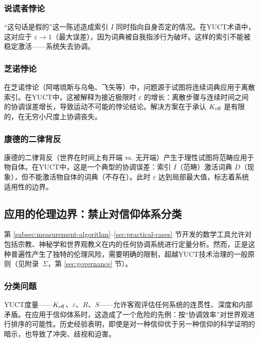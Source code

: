 \documentclass[11pt,a4paper]{article}
\newcommand{\eps}{\varepsilon}
\begin{document}
	\subsubsection{说谎者悖论}
	
	“这句话是假的”这一陈述造成索引 \(I\) 同时指向自身否定的情况。在YUCT术语中，这对应于 \(\eps \to 1\)（最大误差），因为词典被自我指涉行为破坏。这样的索引不能被稳定激活——系统失去协调。
	
	\subsubsection{芝诺悖论}
	
	在芝诺悖论（阿喀琉斯与乌龟、飞矢等）中，问题源于试图将连续词典应用于离散索引。在YUCT中，这被解释为接近极限时 \(\eps\) 的增长：离散步骤与连续时间之间的协调误差增长，导致运动不可能的悖论结论。解决方案在于承认 \(\Keff\) 是有限的，在无穷小尺度上协调丧失。
	
	\subsubsection{康德的二律背反}
	
	康德的二律背反（世界在时间上有开端 vs. 无开端）产生于理性试图将范畴应用于物自体。在YUCT中，这是一个典型的协调误差：索引 \(I\)（范畴）激活词典 \(D\)（现象），但不能激活物自体的词典（不存在）。此时 \(\eps\) 达到局部最大值，标志着系统适用性的边界。
	
	\subsection{应用的伦理边界：禁止对信仰体系分类}
	\label{subsec:belief-classification}
	
	第 \ref{subsec:measurement-algorithm}–\ref{sec:practical-cases} 节开发的数学工具允许对包括宗教、神秘学和世界观教义在内的任何协调系统进行定量分析。然而，正是这种普遍性产生了独特的伦理风险，需要明确的限制，超越YUCT技术治理的一般原则（见附录~$\Sigma$，第 \ref{sec:governance} 节）。
	
	\subsubsection{分类问题}
	
	YUCT度量——$\Keff$、$\eps$、$R$、$S$——允许客观评估任何系统的连贯性、深度和内部矛盾。在应用于信仰体系时，这造成了一个危险的先例：按“协调效率”对世界观进行排序的可能性。历史经验表明，即使是对一种信仰优于另一种信仰的科学证明的暗示，也导致了冲突、歧视和迫害。
	
\end{document}
